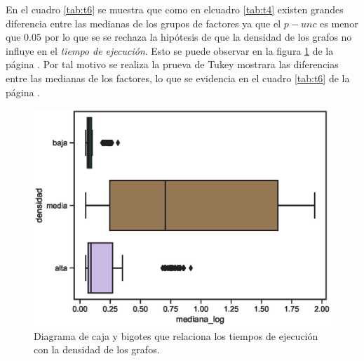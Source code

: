 \documentclass{article}
\begin{document}
En el cuadro \ref{tab:t6} se muestra que como en elcuadro \ref{tab:t4} existen grandes diferencia entre las medianas de los grupos de factores ya que el $p-unc$ es menor que $0.05$ por lo que se se rechaza la hipótesis de que la densidad de los grafos no influye en el \textit{tiempo de ejecución}. Esto se puede observar en la figura \ref{fig8} de la página \pageref{fig8}. Por tal motivo se realiza la prueva de Tukey mostrara las diferencias entre las medianas de los factores, lo que se evidencia en el cuadro \ref{tab:t6} de la página \pageref{tab:t6}. 
\begin{center}
\begin{figure}[htbp]
\includegraphics[scale=0.6]{boxplotdensidad.eps}
\caption{Diagrama de caja y bigotes que relaciona los tiempos de ejecución con la densidad de los grafos.}
\label{fig8}
\end{figure}
\end{center}
\end{document}
